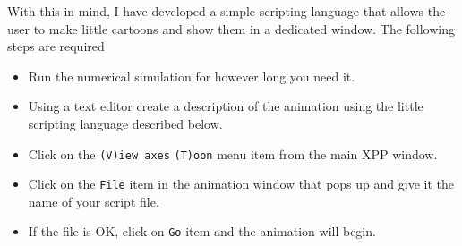 \documentclass{article}
\begin{document}
With this in mind, I have developed a simple scripting language that
allows the user to make little cartoons and show them in a dedicated
window.  The following steps are required
\begin{itemize}
\item Run the numerical simulation for however long you need it.
\item  Using a text editor create a description of the animation using
the little scripting language described below.
\item Click on the {\tt (V)iew axes} {\tt (T)oon} menu item from the
main XPP window.
\item Click on the {\tt File} item in the animation window that pops
up and give it the name of your script file.
\item If the file is OK, click on {\tt Go} item and the animation will
begin.
\end{itemize}
\end{document}
